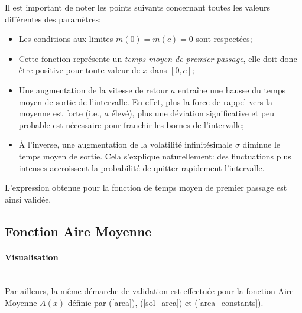Il est important de noter les points suivants concernant toutes les valeurs différentes des paramètres:
\begin{itemize}
    \item Les conditions aux limites $m(0)=m(c)=0$ sont respectées;
    \item Cette fonction représente un \textit{temps moyen de premier passage}, elle doit donc être positive pour toute valeur de $x$ dans $[0,c]$;
    \item Une augmentation de la vitesse de retour $a$ entraîne une hausse du temps moyen de sortie de l'intervalle. En effet, plus la force de rappel vers la moyenne est forte (i.e., $a$ élevé), plus une déviation significative et peu probable est nécessaire pour franchir les bornes de l'intervalle;
    \item À l'inverse, une augmentation de la volatilité infinitésimale $\sigma$ diminue le temps moyen de sortie. Cela s'explique naturellement: des fluctuations plus intenses accroissent la probabilité de quitter rapidement l'intervalle.
\end{itemize}

L'expression obtenue pour la fonction de temps moyen de premier passage est ainsi validée.

\subsection{Fonction Aire Moyenne}

\paragraph{Visualisation}\phantom{}\\
Par ailleurs, la même démarche de validation est effectuée pour la fonction Aire Moyenne $A(x)$ définie par (\ref{area}), (\ref{sol_area}) et (\ref{area_constants}).

